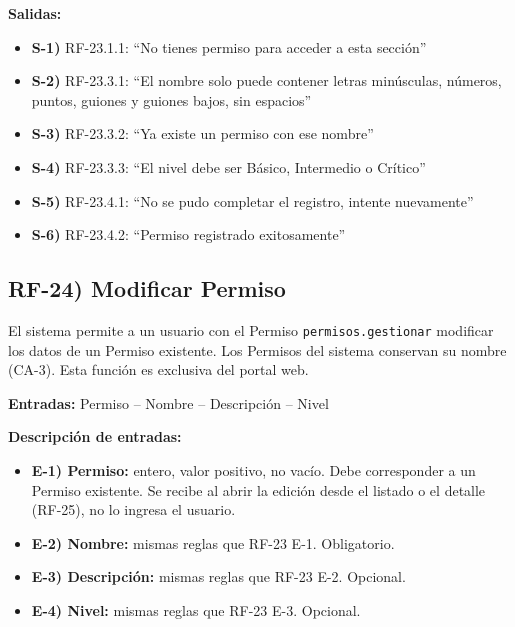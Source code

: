 \textbf{Salidas:}
\begin{itemize}[label={}, leftmargin=1.5em]
  \item \textbf{S-1)} RF-23.1.1: ``No tienes permiso para acceder a esta secci\'on''
  \item \textbf{S-2)} RF-23.3.1: ``El nombre solo puede contener letras min\'usculas, n\'umeros, puntos, guiones y guiones bajos, sin espacios''
  \item \textbf{S-3)} RF-23.3.2: ``Ya existe un permiso con ese nombre''
  \item \textbf{S-4)} RF-23.3.3: ``El nivel debe ser B\'asico, Intermedio o Cr\'itico''
  \item \textbf{S-5)} RF-23.4.1: ``No se pudo completar el registro, intente nuevamente''
  \item \textbf{S-6)} RF-23.4.2: ``Permiso registrado exitosamente''
\end{itemize}

\subsection*{RF-24) Modificar Permiso}
El sistema permite a un usuario con el Permiso \texttt{permisos.gestionar} modificar los datos de un Permiso existente. Los Permisos del sistema conservan su nombre (CA-3). Esta funci\'on es exclusiva del portal web.

\textbf{Entradas:} Permiso -- Nombre -- Descripci\'on -- Nivel

\textbf{Descripci\'on de entradas:}
\begin{itemize}[label={}, leftmargin=1.5em]
  \item \textbf{E-1) Permiso:} entero, valor positivo, no vac\'io. Debe corresponder a un Permiso existente. Se recibe al abrir la edici\'on desde el listado o el detalle (RF-25), no lo ingresa el usuario.
  \item \textbf{E-2) Nombre:} mismas reglas que RF-23 E-1. Obligatorio.
  \item \textbf{E-3) Descripci\'on:} mismas reglas que RF-23 E-2. Opcional.
  \item \textbf{E-4) Nivel:} mismas reglas que RF-23 E-3. Opcional.
\end{itemize}

